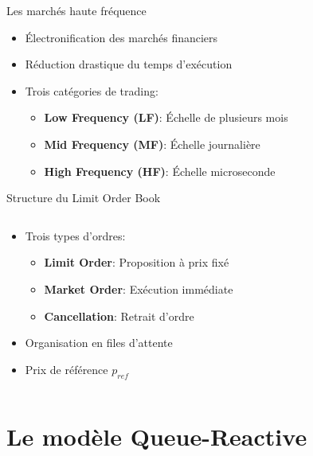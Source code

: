 \documentclass[aspectratio=169]{beamer}  %
\begin{document}
\begin{frame}{Les marchés haute fréquence}
    \begin{itemize}
        \item Électronification des marchés financiers
        \item Réduction drastique du temps d'exécution
        \item Trois catégories de trading:
        \begin{itemize}
            \item \textbf{Low Frequency (LF)}: Échelle de plusieurs mois
            \item \textbf{Mid Frequency (MF)}: Échelle journalière
            \item \textbf{High Frequency (HF)}: Échelle microseconde
        \end{itemize}
    \end{itemize}
\end{frame}

\begin{frame}{Structure du Limit Order Book}
    \begin{columns}
        \begin{column}{0.6\textwidth}
            \begin{itemize}
                \item Trois types d'ordres:
                \begin{itemize}
                    \item \textbf{Limit Order}: Proposition à prix fixé
                    \item \textbf{Market Order}: Exécution immédiate
                    \item \textbf{Cancellation}: Retrait d'ordre
                \end{itemize}
                \item Organisation en files d'attente
                \item Prix de référence $p_{ref}$
            \end{itemize}
        \end{column}
        \begin{column}{0.4\textwidth}
        \end{column}
    \end{columns}
\end{frame}

\section{Le modèle Queue-Reactive}
\end{document}
